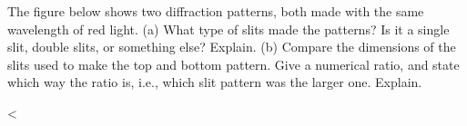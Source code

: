 The figure below shows two diffraction patterns, both
made with the same wavelength of red light. (a) What type of
slits made the patterns? Is it a single slit, double slits,
or something else? Explain. (b) Compare the dimensions of
the slits used to make the top and bottom pattern. Give a
numerical ratio, and state which way the ratio is, i.e.,
which slit pattern was the larger one. Explain.

<%
